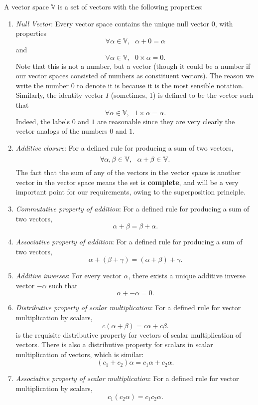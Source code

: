 \\\\
A vector space $\mathbb{V}$ is a set of vectors with the following properties:
\begin{enumerate}
    \item \textit{Null Vector}: Every vector space contains the unique null vector $0$, with properties
    $$
    \forall \alpha \in \mathbb{V}, \:\:\: \alpha + 0 = \alpha
    $$
    and
    $$
    \forall \alpha \in \mathbb{V}, \:\:\: 0\times\alpha = 0.
    $$
    Note that this is not a number, but a vector (though it could be a number if our vector spaces consisted of numbers as constituent vectors). The reason we write the number 0 to denote it is because it is the most sensible notation. Similarly, the identity vector $I$ (sometimes, 1) is defined to be the vector such that
    $$
    \forall \alpha \in \mathbb{V}, \:\:\: 1\times\alpha = \alpha.
    $$
    Indeed, the labels $0$ and $1$ are reasonable since they are very clearly the vector analogs of the numbers $0$ and $1$.
    \item \textit{Additive closure}: For a defined rule for producing a sum of two vectors, 
    $$
    \forall \alpha,\beta\in\mathbb{V}, \:\:\: \alpha + \beta \in \mathbb{V}.
    $$
    The fact that the sum of any of the vectors in the vector space is another vector in the vector space means the set is \textbf{complete}, and will be a very important point for our requirements, owing to the superposition principle.
    \item \textit{Commutative property of addition}: For a defined rule for producing a sum of two vectors, 
    $$
    \alpha + \beta =  \beta +  \alpha.
    $$
    \item \textit{Associative property of addition}: For a defined rule for producing a sum of two vectors, 
    $$
    \alpha + (\beta +\gamma) =  (\alpha + \beta) +\gamma.
    $$
    \item \textit{Additive inverses}: For every vector $\alpha$, there exists a unique additive inverse vector $-\alpha$ such that
    $$
    \alpha + -\alpha = 0.
    $$
    \item \textit{Distributive property of scalar multiplication}: For a defined rule for vector multiplication by scalars, 
    $$
    c(\alpha+ \beta) = c\alpha + c\beta.
    $$ 
    is the requisite distributive property for vectors of scalar multiplication of vectors. There is also a distributive property for scalars in scalar multiplication of vectors, which is similar:
    $$
    (c_1+c_2)\alpha = c_1\alpha + c_2 \alpha.
    $$
    \item \textit{Associative property of scalar multiplication}: For a defined rule for vector multiplication by scalars, 
    $$
    c_1(c_2\alpha)=c_1c_2\alpha.
    $$
\end{enumerate} 
